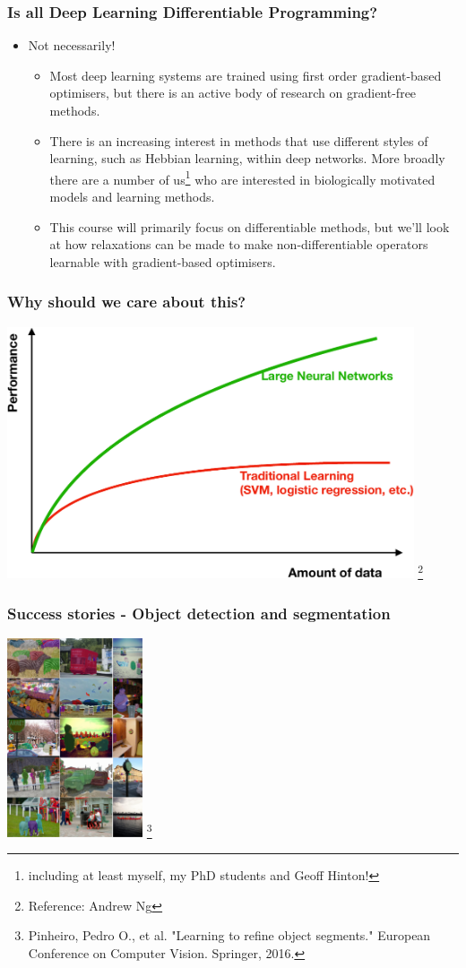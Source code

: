 \documentclass[\beamerclass]{beamer}
\newcommand\blfootnote[1]{%
  \begingroup
  \renewcommand\thefootnote{}\footnote{#1}%
  \addtocounter{footnote}{-1}%
  \endgroup
}
\begin{document}
\begin{frame}
\frametitle{Is all Deep Learning Differentiable Programming?}
\begin{itemize}
	\item Not necessarily!
	\begin{itemize}
		\item<+-> Most deep learning systems are trained using first order gradient-based optimisers, but there is an active body of research on gradient-free methods.
		\item<+-> There is an increasing interest in methods that use different styles of learning, such as Hebbian learning, within deep networks. More broadly there are a number of us\footnote{including at least myself, my PhD students and Geoff Hinton!} who are interested in biologically motivated models and learning methods.
		\item<+-> This course will primarily focus on differentiable methods, but we'll look at how relaxations can be made to make non-differentiable operators learnable with gradient-based optimisers.
	\end{itemize}
\end{itemize}
\end{frame}

\begin{frame}
	\frametitle{Why should we care about this?}
	\centering \includegraphics[width=0.9\textwidth]{Fig1.pdf}\blfootnote{Reference: Andrew Ng}
\end{frame}

\begin{frame}
	\frametitle{Success stories - Object detection and segmentation}
	\centering \includegraphics[width=0.3\textwidth]{objseg.pdf}\blfootnote{Pinheiro, Pedro O., et al. "Learning to refine object segments." European Conference on Computer Vision. Springer, 2016.}
\end{frame}
\end{document}
